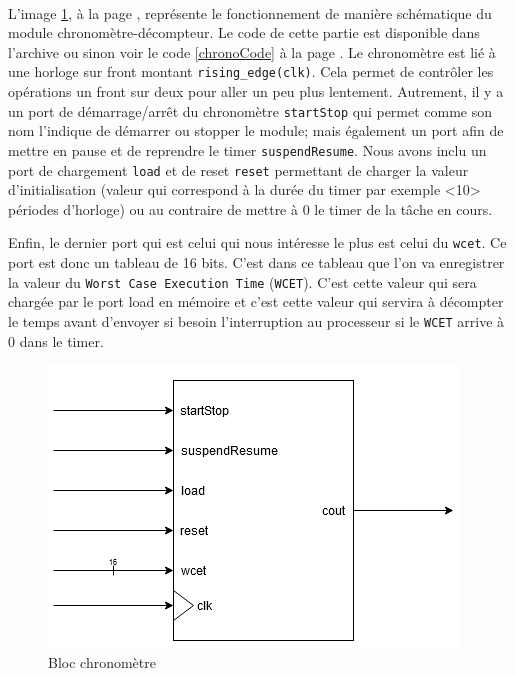 \documentclass[a4paper,12pt]{report}
\begin{document}
			\paragraph*{}
			L'image \ref{chrono}, à la page \pageref{chrono}, représente le fonctionnement de manière schématique du module chronomètre-décompteur. Le code de cette partie est disponible dans l'archive ou sinon voir le code \ref{chronoCode} à la page \pageref{chronoCode}.
			Le chronomètre est lié à une horloge sur front montant \texttt{rising\_edge(clk)}. Cela permet de contrôler les opérations un front sur deux pour aller un peu plus lentement.
			Autrement, il y a un port de démarrage/arrêt du chronomètre \texttt{startStop} qui permet comme son nom l'indique de démarrer ou stopper le module; mais également un port afin de mettre en pause et de reprendre le timer \texttt{suspendResume}. Nous avons inclu un port de chargement \texttt{load} et de reset \texttt{reset} permettant de charger la valeur d'initialisation (valeur qui correspond à la durée du timer par exemple <10> périodes d'horloge) ou au contraire de mettre à 0 le timer de la tâche en cours.
			
			Enfin, le dernier port qui est celui qui nous intéresse le plus est celui du \texttt{wcet}. Ce port est donc un tableau de 16 bits. C'est dans ce tableau que l'on va enregistrer la valeur du \texttt{Worst Case Execution Time} (\texttt{WCET}). C'est cette valeur qui sera chargée par le port load en mémoire et c'est cette valeur qui servira à décompter le temps avant d'envoyer si besoin l'interruption au processeur si le \texttt{WCET} arrive à 0 dans le timer.
			
			\begin{figure}[H]
				\centering
					\includegraphics[scale=1]{chrono.png}
					\caption{Bloc chronomètre}
				\label{chrono}
			\end{figure}
			
\end{document}

